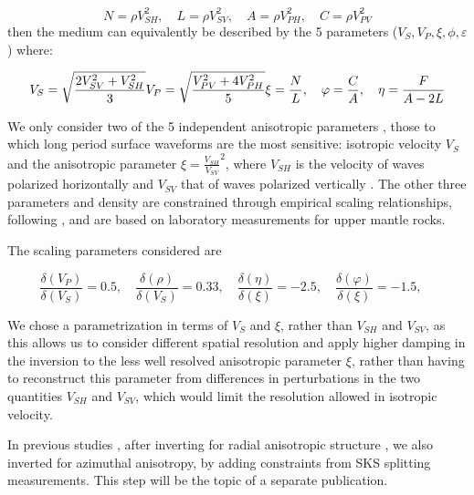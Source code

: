 \documentclass[12pt]{article}
\begin{document}
\begin{equation}
 N = \rho V^{2}_{SH}, \quad L = \rho V^{2}_{SV}, \quad A = \rho V^{2}_{PH} , \quad C = \rho V^{2}_{PV} 
 \end{equation}
then the medium can equivalently be described by the 5 parameters ($V_{S}, V_{P}, \xi, \phi, \varepsilon$) where:

\begin{equation}
V_{S} = \sqrt{\frac{2V^{2}_{SV}+V^{2}_{SH}} {3}} \\
V_{P} = \sqrt{\frac{V^{2}_{PV} + 4V^{2}_{PH}}{5}}
 \xi = \frac{N}{L}, \quad \varphi = \frac{C}{A}, \quad \eta = \frac{F}{A-2L} 
 \end{equation}

We only consider two of the 5 independent anisotropic parameters , those to which long period surface waveforms are the most sensitive: isotropic velocity $V_{S}$ and the anisotropic parameter $\xi = {\frac{V_{SH}}{V_{SV}}}^2$, where $V_{SH}$ is the velocity of waves polarized horizontally and $V_{SV}$ that of waves polarized vertically . 
The other three parameters and density are constrained through empirical scaling relationships, following \cite{montagner1989petrological}, and are based on laboratory measurements for upper mantle rocks. 

The scaling parameters considered are \citep{montagner1989petrological}

 \begin{equation}
\frac{\delta(V_{P})}{\delta(V_{S})} = 0.5, \quad
\frac{\delta(\rho)}{\delta(V_{S})} = 0.33, \quad
\frac{\delta(\eta)}{\delta(\xi)} = -2.5,   \quad
\frac{\delta(\varphi)}{\delta(\xi)} = -1.5,   \quad
\end{equation}

We chose a parametrization in terms of $V_S$ and $\xi$, rather than $V_{SH}$ and $V_{SV}$, as this allows us to consider different spatial resolution and apply higher damping in the inversion to the less well resolved anisotropic parameter $\xi$, rather than having to reconstruct this parameter from differences in perturbations in the two quantities $V_{SH}$ and $V_{SV}$, which would limit the resolution allowed in isotropic velocity.

In previous studies \citep{marone2007depth,yuan2010lithospheric}, after inverting for radial anisotropic structure \citep{marone2007three,yuan20113}, we also inverted for azimuthal anisotropy, by adding constraints from SKS splitting measurements. This step will be the topic of a separate publication.  
\end{document}
